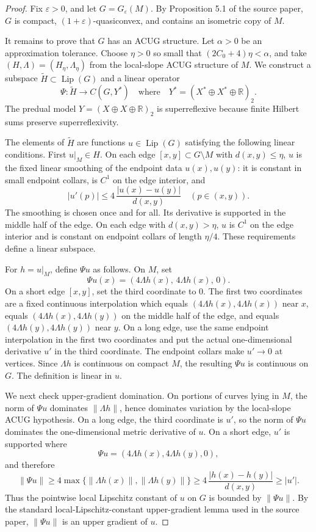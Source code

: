 \documentclass[11pt]{article}
\newcommand{\Lip}{\operatorname{Lip}}
\newcommand{\R}{\mathbb R}
\newcommand{\eps}{\varepsilon}
\begin{document}
\begin{proof}
Fix \(\eps>0\), and let \(G=G_\eps(M)\).  By Proposition 5.1 of the source
paper, \(G\) is compact, \((1+\eps)\)-quasiconvex, and contains an isometric
copy of \(M\).

It remains to prove that \(G\) has an ACUG structure.  Let
\(\alpha>0\) be an approximation tolerance.  Choose
\(\eta>0\) so small that \((2C_0+4)\eta<\alpha\), and take
\((H,\Lambda)=(H_\eta,\Lambda_\eta)\) from the local-slope ACUG structure of
\(M\).  We construct a subspace \(\widetilde H\subset\Lip(G)\) and a linear
operator
\[
   \Psi:\widetilde H\longrightarrow C(G,Y^*)
       \quad\text{where}\quad
   Y^*=(X^*\oplus X^*\oplus \R)_2 .
\]
The predual model \(Y=(X\oplus X\oplus\R)_2\) is superreflexive because
finite Hilbert sums preserve superreflexivity.

The elements of \(\widetilde H\) are functions \(u\in\Lip(G)\) satisfying the
following linear conditions.  First \(u|_M\in H\).  On each edge
\([x,y]\subset G\setminus M\) with \(d(x,y)\le \eta\), \(u\) is the fixed
linear smoothing of the endpoint data \(u(x),u(y)\): it is constant in small
endpoint collars, is \(C^1\) on the edge interior, and
\[
   |u'(p)|\le 4\,\frac{|u(x)-u(y)|}{d(x,y)}
   \quad(p\in (x,y)).
\]
The smoothing is chosen once and for all.  Its derivative is supported in the
middle half of the edge.  On each edge with \(d(x,y)>\eta\), \(u\) is \(C^1\)
on the edge interior and is constant on endpoint collars of length \(\eta/4\).
These requirements define a linear subspace.

For \(h=u|_M\), define \(\Psi u\) as follows.  On \(M\), set
\[
   \Psi u(x)=(4\Lambda h(x),\,4\Lambda h(x),\,0).
\]
On a short edge \([x,y]\), set the third coordinate to \(0\).  The first two
coordinates are a fixed continuous interpolation which equals
\((4\Lambda h(x),4\Lambda h(x))\) near \(x\), equals
\((4\Lambda h(x),4\Lambda h(y))\) on the middle half of the edge, and equals
\((4\Lambda h(y),4\Lambda h(y))\) near \(y\).  On a long edge, use the same
endpoint interpolation in the first two coordinates and put the actual
one-dimensional derivative \(u'\) in the third coordinate.  The endpoint
collars make \(u'\to0\) at vertices.  Since \(\Lambda h\) is continuous on
compact \(M\), the resulting \(\Psi u\) is continuous on \(G\).  The definition
is linear in \(u\).

We next check upper-gradient domination.  On portions of curves lying in
\(M\), the norm of \(\Psi u\) dominates
\(\|\Lambda h\|\), hence dominates variation by the local-slope ACUG
hypothesis.  On a long edge, the third coordinate is \(u'\), so the norm of
\(\Psi u\) dominates the one-dimensional metric derivative of \(u\).  On a
short edge, \(u'\) is supported where
\[
   \Psi u=(4\Lambda h(x),4\Lambda h(y),0),
\]
and therefore
\[
   \|\Psi u\|
   \ge 4\max\{\|\Lambda h(x)\|,\|\Lambda h(y)\|\}
   \ge 4\,\frac{|h(x)-h(y)|}{d(x,y)}
   \ge |u'|.
\]
Thus the pointwise local Lipschitz constant of \(u\) on \(G\) is bounded by
\(\|\Psi u\|\).  By the standard local-Lipschitz-constant upper-gradient
lemma used in the source paper, \(\|\Psi u\|\) is an upper gradient of \(u\).


\end{proof}
\end{document}
